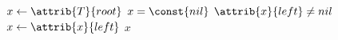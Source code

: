 \begin{codebox}
\li $x \gets \attrib{T}{root}$
\li \If $x = \const{nil}$
\li \Then
		\Return {}
\li \Else
\li 	\While $\attrib{x}{left} \neq nil$
\li 	\Do 
			$x \gets \attrib{x}{left}$
		\End
	\End
\li \Return $x$
\end{codebox}